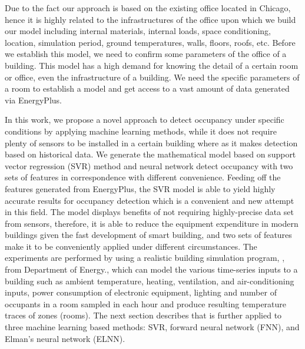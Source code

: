 Due to the fact our approach is based on the existing office located in Chicago, hence it is highly related to the infrastructures of the office upon which we build our model including internal
materials, internal loads, space conditioning, location, simulation
period, ground temperatures, walls, floors, roofs, etc. Before we
establish this model, we need to confirm some parameters of the office
of a building. This model has a high demand for knowing the detail of
a certain room or office, even the infrastructure of a building. We
need the specific parameters of a room to establish a model and get
access to a vast amount of data generated via EnergyPlus.

In this work, we propose a novel approach to detect occupancy under
specific conditions by applying machine learning methods, while it does
not require plenty of sensors to be installed in a certain building where as it makes detection based on historical data. We generate the mathematical model based on support vector regression (SVR) method and neural network detect occupancy with two sets of features in correspondence with different convenience. Feeding off
the features generated from EnergyPlus, the SVR model is able to yield
highly accurate results for occupancy detection which is a convenient
and new attempt in this field. The model displays benefits of not
requiring highly-precise data set from sensors, therefore, it is able
to reduce the equipment expenditure in modern buildings given the fast
development of smart building, and two sets of features make it to be
conveniently applied under different circumstances. The experiments are performed by using a realistic building simulation program, \EP{}, from Department of Energy., which can model the various
time-series inputs to a building such as ambient temperature, heating,
ventilation, and air-conditioning inputs, power consumption of
electronic equipment, lighting and number of occupants in a room
sampled in each hour and produce resulting temperature traces of zones
(rooms). The next section describes \EP{} that is further applied to three machine learning based methods: SVR, forward neural network (FNN), and Elman's neural network (ELNN).


